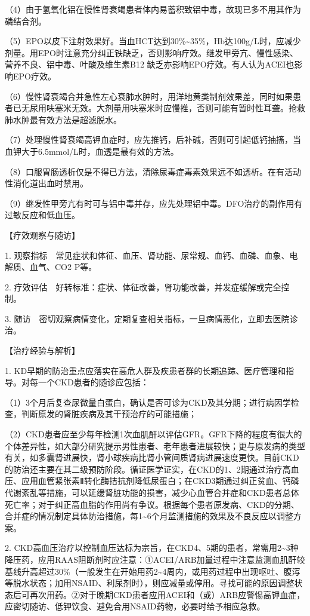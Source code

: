 （4）由于氢氧化铝在慢性肾衰竭患者体内易蓄积致铝中毒，故现已多不用其作为磷结合剂。

（5）EPO以皮下注射效果好。当血HCT达到30\%\textasciitilde{}35\%，Hb达100g/L时，应减少剂量。用EPO时注意充分纠正铁缺乏，否则影响疗效。继发甲旁亢、慢性感染、营养不良、铝中毒、叶酸及维生素B{12}
缺乏亦影响EPO疗效。有人认为ACEI也影响EPO疗效。

（6）慢性肾衰竭合并急性左心衰肺水肿时，用洋地黄类制剂效果差，同时如果患者已无尿用呋塞米无效。大剂量用呋塞米时应慢推，否则可能有暂时性耳聋。抢救肺水肿最有效方法是超滤脱水。

（7）处理慢性肾衰竭高钾血症时，应先推钙，后补碱，否则可引起低钙抽搐，当血钾大于6.5mmol/L时，血透是最有效的方法。

（8）口服胃肠透析仅是不得已方法，清除尿毒症毒素效果远不如透析。在有活动性消化道出血时禁用。

（9）继发性甲旁亢有时可与铝中毒并存，应先处理铝中毒。DFO治疗的副作用有过敏反应和低血压。

【疗效观察与随访】

1.
观察指标　常见症状和体征、血压、肾功能、尿常规、血钙、血磷、血象、电解质、血气、CO{2}
P等。

2.
疗效评估　好转标准：症状、体征改善，肾功能改善，并发症缓解或完全控制。

3.
随访　密切观察病情变化，定期复查相关指标，一旦病情恶化，立即去医院诊治。

【治疗经验与解析】

1.
KD早期的防治重点应落实在高危人群及疾患者群的长期追踪、医疗管理和指导。对每一个CKD患者的随诊应包括：

（1）3个月后复查尿微量白蛋白，确认是否可诊为CKD及其分期；进行病因学检查，判断原发的肾脏疾病及其干预治疗的可能措施；

（2）CKD患者应至少每年检测1次血肌酐以评估GFR。GFR下降的程度有很大的个体差异性，如大部分研究提示男性患者、老年患者进展较快；更与原发病的类型有关，如多囊肾进展快，肾小球疾病比肾小管间质肾病进展速度更快。目前CKD的防治还主要在其二级预防阶段。循证医学证实，在CKD的1、2期通过治疗高血压、应用血管紧张素Ⅱ转化酶拮抗剂降低尿蛋白；在CKD3期通过纠正贫血、钙磷代谢紊乱等措施，可以延缓肾脏功能的损害，减少心血管合并症和CKD患者总体死亡率；对于纠正高血脂的作用尚有争议。根据每个患者原发病、CKD的分期、合并症的情况制定具体防治措施，每1\textasciitilde{}6个月监测措施的效果及不良反应以调整方案。

2.
CKD高血压治疗以控制血压达标为宗旨，在CKD4、5期的患者，常需用2\textasciitilde{}3种降压药，应用RAAS阻断剂时应注意：①ACEI/ARB加量过程中注意监测血肌酐较基线升高超过30\%（一般发生在开始用药2\textasciitilde{}4周内，或用药过程中出现呕吐、腹泻等脱水状态；加用NSAID、利尿剂时），则应减量或停用。寻找可能的原因调整状态后可再次用药。②对于晚期CKD患者应用ACEI和（或）ARB应警惕高钾血症，应密切随访、低钾饮食、避免合用NSAID药物，必要时给予相应急救。

